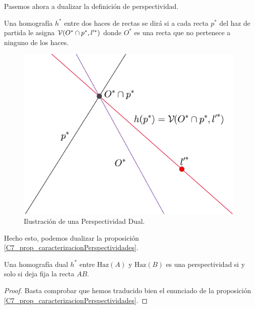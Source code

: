 Pasemos ahora a dualizar la definición de perspectividad.
\begin{defi}
	Una homografía $h^*$ entre dos haces de rectas se dirá  si a cada recta $p^*$ del haz de partida le asigna $\mathcal{V}(O^*\cap p^*,l'^*)$ donde $O^*$ es una recta que no pertenece a ninguno de los haces.
\end{defi}
\begin{figure}[h]
	\centering
	\includegraphics[scale=.1]{Graficos/perspectividadDual.eps}
	\caption{Ilustración de una Perspectividad Dual.}
	\label{C7_img_perspectividadDual}
\end{figure}
Hecho esto, podemos dualizar la proposición \ref{C7_prop_caracterizacionPerspectividades}.
\begin{prop}
	Una homografía dual $h^*$ entre $\mathrm{Haz}(A)$ y $\mathrm{Haz}(B)$ es una perspectividad si y solo si deja fija la recta $AB$.
\end{prop}
\begin{proof}
	Basta comprobar que hemos traducido bien el enunciado de la proposición \ref{C7_prop_caracterizacionPerspectividades}.
\end{proof}
